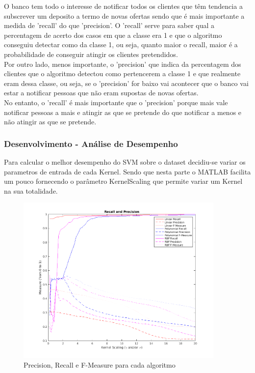 \documentclass[portugues,final]{revdetua}
\begin{document}
O banco tem todo o interesse de notificar todos os clientes que têm tendencia a subscrever um deposito a termo de novas ofertas sendo que é mais importante a medida de 'recall' do que 'precision'. O 'recall' serve para saber qual a percentagem de acerto dos casos em que a classe era 1 e que o algoritmo conseguiu detectar como da classe 1, ou seja, quanto maior o recall, maior é a probabilidade de conseguir atingir os clientes pretendidos.\\

Por outro lado, menos importante, o 'precision' que indica da percentagem dos clientes que o algoritmo detectou como pertencerem a classe 1 e que realmente eram dessa classe, ou seja, se o 'precision' for baixo vai acontecer que o banco vai estar a notificar pessoas que não eram supostas de novas ofertas.\\

No entanto, o 'recall' é mais importante que o 'precision' porque mais vale notificar pessoas a mais e atingir as que se pretende do que notificar a menos e não atingir as que se pretende.

\subsubsection{Desenvolvimento - Análise de Desempenho}

Para calcular o melhor desempenho do SVM sobre o dataset decidiu-se variar os parametros de entrada de cada Kernel. Sendo que nesta parte o MATLAB facilita um pouco fornecendo o parâmetro KernelScaling que permite variar um Kernel na sua totalidade.\\

\begin{figure}[H]
\centerline{\includegraphics[width=290pt]{images/svm_recall_precision.png}}
\caption{Precision, Recall e F-Measure para cada algoritmo}
\label{img:complete}
\end{figure}
\end{document}
